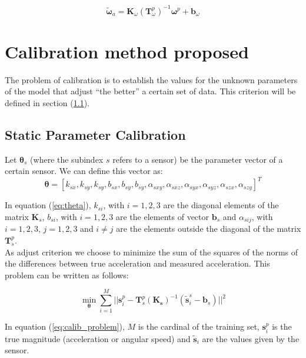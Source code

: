 \documentclass[conference]{IEEEtran}
\newcommand{\refp}[1]{(\ref{#1})}
\begin{document}
\begin{equation}
\tilde{\boldsymbol{\omega}}_a = \mathbf{K}_{\omega}(\mathbf{T}_{\omega}^p)^{-1}\boldsymbol{\omega}^p+\mathbf{b}_{\omega}
\end{equation}

\section{Calibration method proposed}
The problem of calibration is to establish the values for the unknown parameters of the model that adjust ``the better'' a certain set of data. This criterion will be defined in section \refp{sec:param}. 


\subsection{Static Parameter Calibration}
\label{sec:param}

Let $\boldsymbol{\theta}_s$ (where the subindex $s$ refers to a sensor) be the parameter vector of a certain sensor. We can define this vector as:
\begin{equation}
\boldsymbol{\theta} = [k_{sx},k_{sy},k_{sy},b_{sx},b_{sy},b_{sy}, \alpha_{sxy},\alpha_{sxz},\alpha_{syx},\alpha_{syz},\alpha_{szx},\alpha_{szy}]^T
\label{eq:theta}
\end{equation}

In equation \refp{eq:theta}, $k_{si}$, with $i=1,2,3$ are the diagonal elements of the matrix $\mathbf{K}_s$, $b_{si}$, with $i = 1,2,3$ are the elements of vector $\mathbf{b}_s$ and $\alpha_{sij}$, with $i = 1,2,3$, $j = 1,2,3$ and $i \neq j$ are the elements outside the diagonal of the matrix $\mathbf{T}_s^p$.\\

As adjust criterion we choose to minimize the sum of the squares of the norms of the differences between true acceleration and measured acceleration. This problem can be written as follows:

\begin{equation}
\min_{\boldsymbol{\theta}} \sum_{i = 1}^M ||\mathbf{s}_i^p - \mathbf{T}_s^p(\mathbf{K_s})^{-1}(\tilde{\mathbf{s}}_i^s-\mathbf{b}_s) ||^2
\label{eq:calib_problem}
\end{equation}

In equation \refp{eq:calib_problem}, $M$ is the cardinal of the training set, $\mathbf{s}_i^p$ is the true magnitude (acceleration or angular speed) and $\tilde{\mathbf{s}}_i$ are the values given by the sensor.\\
\end{document}
